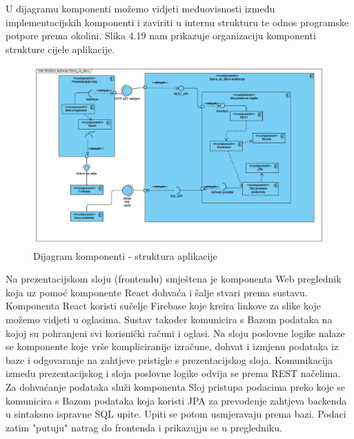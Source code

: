 		U dijagramu komponenti možemo vidjeti međuovisnosti između implementacijskih komponenti i zaviriti u internu strukturu te odnos programske potpore prema okolini. Slika 4.19 nam prikazuje organizaciju komponenti strukture cijele aplikacije. \\
			
			\begin{figure}[H]
               		 	\includegraphics[width=\textwidth,height=0.5\textheight]{dijagrami/Dijagram_komponenti.png}%
				\centering
				\caption{Dijagram komponenti - struktura aplikacije}
				\label{fig:ComponentDiagram}
			\end{figure}		

		Na prezentacijskom sloju (frontendu) smještena je komponenta Web preglednik koja uz pomoć komponente React dohvaća i šalje stvari prema sustavu. Komponenta React koristi sučelje Firebase koje kreira linkove za slike koje možemo vidjeti u oglasima. Sustav također komunicira s Bazom podataka na kojoj su pohranjeni svi korisnički računi i oglasi. Na sloju poslovne logike nalaze se komponente koje vrše kompliciranije izračune, dohvat i izmjenu podataka iz baze i odgovaranje na zahtjeve pristigle s prezentacijskog sloja. Komunikacija izmedu prezentacijskog i sloja poslovne logike odvija se prema REST načelima. Za dohvaćanje podataka služi komponenta Sloj pristupa podacima preko koje se komunicira s Bazom podataka koja koristi JPA za prevodenje zahtjeva backenda u sintaksno ispravne SQL upite. Upiti se potom usmjeravaju prema bazi. Podaci zatim "putuju" natrag do frontenda i prikazujju se u pregledniku. 

			\eject

		
